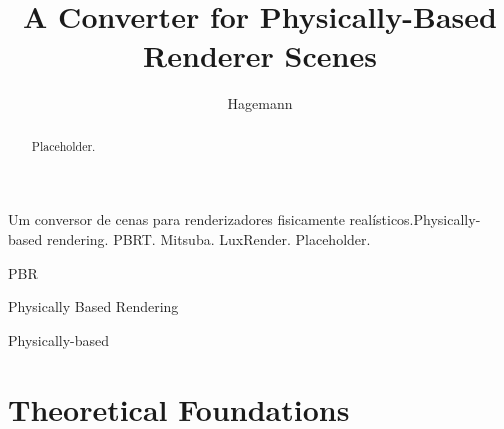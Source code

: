 \documentclass[cic,tc,english]{iiufrgs}
\title{A Converter for Physically-Based Renderer Scenes}
\author{Hagemann}{Luiza de Azambuja}
\begin{document}
\maketitle




\begin{abstract}
    Placeholder.
\end{abstract}

\begin{englishabstract}{Um conversor de cenas para renderizadores fisicamente realísticos.}{Physically-based rendering. PBRT. Mitsuba. LuxRender.}
    Placeholder.
\end{englishabstract}

\listoffigures


\begin{listofabbrv}{PBR}
    \item[PBR] Physically Based Rendering
    \item[PB] Physically-based
\end{listofabbrv}


\tableofcontents



\chapter{Theoretical Foundations}







\end{document}
